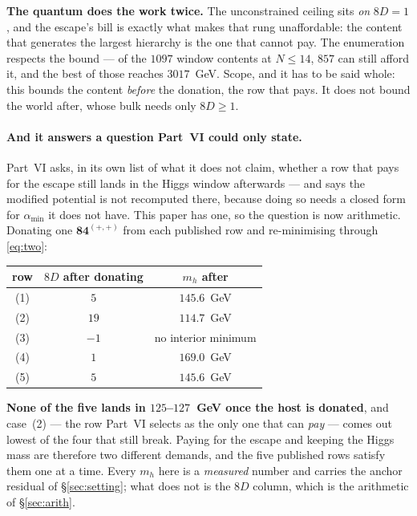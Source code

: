 \documentclass[11pt,a4paper]{article}
\newcommand{\rep}[1]{\mathbf{#1}}
\newcommand{\amin}{\alpha_{\min}}
\begin{document}
\noindent\textbf{The quantum does the work twice.} The unconstrained ceiling sits \emph{on} $8D=1$, and the
escape's bill is exactly what makes that rung unaffordable: the content that generates the largest
hierarchy is the one that cannot pay. The enumeration respects the bound --- of the $1097$ window
contents at $N\le14$, $857$ can still afford it, and the best of those reaches $3017$~GeV. Scope,
and it has to be said whole: this bounds the content \emph{before} the donation, the row that pays.
It does not bound the world after, whose bulk needs only $8D\ge1$.

\paragraph{And it answers a question Part~VI could only state.} Part~VI asks, in its own list of
what it does not claim, whether a row that pays for the escape still lands in the Higgs window
afterwards --- and says the modified potential is not recomputed there, because doing so needs a
closed form for $\amin$ it does not have. This paper has one, so the question is now arithmetic.
Donating one $\rep{84}^{(+,+)}$ from each published row and re-minimising through \eqref{eq:two}:
\begin{center}\small
{}
\begin{tabular}{ccc}
\toprule
\rowcolor{hdrblue!10}row & $8D$ after donating & $m_h$ after\\
\midrule
\rowcolor{amber!12}(1) & $5$  & $145.6$~GeV\\
\rowcolor{amber!14}(2) & $19$ & $114.7$~GeV\\
\rowcolor{warmred!13}(3) & $-1$ & no interior minimum\\
\rowcolor{amber!12}(4) & $1$  & $169.0$~GeV\\
\rowcolor{amber!12}(5) & $5$  & $145.6$~GeV\\
\bottomrule
\end{tabular}
\end{center}
\noindent \textbf{None of the five lands in $125$--$127$~GeV once the host is donated}, and case~(2)
--- the row Part~VI selects as the only one that can \emph{pay} --- comes out lowest of the four
that still break. Paying for the escape and keeping the Higgs mass are therefore two different
demands, and the five published rows satisfy them one at a time. Every $m_h$ here is a
\emph{measured} number and carries the anchor residual of \S\ref{sec:setting}; what does not is the
$8D$ column, which is the arithmetic of \S\ref{sec:arith}.
\end{document}
